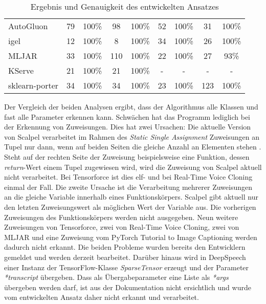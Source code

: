 \documentclass[german,bachelor]{swsLeipzig}
\begin{document}
\begin{table}[H]
\begin{center}
\begin{tabular}[h]{l|c|c|c|c|c|c|c|c}
\hline
AutoGluon                   & 79        & 100\%             & 98        & 100\%                 & 52        & 100\% & 31            & 100\%\\
igel                        & 12        & 100\%             & 8         & 100\%                 & 34        & 100\% & 26            & 100\%\\
MLJAR                       & 33        & 100\%             & 110       & 100\%                 & 22        & 100\% & 27            & 93\%\\
KServe                      & 21        & 100\%             & 21        & 100\%                 & -         & - & -                 & -\\
sklearn-porter              & 34        & 100\%             & 34        & 100\%                 & 23        & 100\% & 123           & 100\%\\
\hline
\end{tabular}
\caption{Ergebnis und Genauigkeit des entwickelten Ansatzes} \label{analyse}
\end{center}
\end{table}

Der Vergleich der beiden Analysen ergibt, dass der Algorithmus alle Klassen und fast alle Parameter erkennen kann.
Schwächen hat das Programm lediglich bei der Erkennung von Zuweisungen.
Dies hat zwei Ursachen:
Die aktuelle Version von Scalpel verarbeitet im Rahmen des \textit{Static Single Assignment} Zuweisungen an Tupel nur dann,
wenn auf beiden Seiten die gleiche Anzahl an Elementen stehen \cite[]{li2022scalpel}.
Steht auf der rechten Seite der Zuweisung beispielsweise eine Funktion, dessen \textit{return}-Wert einem Tupel zugewiesen wird,
wird die Zuweisung von Scalpel aktuell nicht verarbeitet.
Bei Tensorforce ist dies elf- und bei Real-Time Voice Cloning einmal der Fall.
Die zweite Ursache ist die Verarbeitung mehrerer Zuweisungen an die gleiche Variable innerhalb eines Funktionskörpers.
Scalpel gibt aktuell nur den letzten Zuweisungswert als möglichen Wert der Variable aus.
Die vorherigen Zuweisungen des Funktionskörpers werden nicht ausgegeben.
Neun weitere Zuweisungen von Tensorforce, zwei von Real-Time Voice Cloning, zwei von MLJAR und
eine Zuweisung vom PyTorch Tutorial to Image Captioning werden dadurch nicht erkannt.
Die beiden Probleme wurden bereits den Entwicklern gemeldet und werden derzeit bearbeitet.
Darüber hinaus wird in DeepSpeech einer Instanz der TensorFlow-Klasse \textit{SparseTensor} erzeugt und der Parameter \textit{*transcript} übergeben.
Dass als Übergabeparameter eine Liste als \textit{*args} übergeben werden darf, ist aus der Dokumentation nicht ersichtlich
und wurde vom entwickelten Ansatz daher nicht erkannt und verarbeitet.\\
\end{document}
